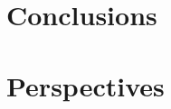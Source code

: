 
\section*{Conclusions} %
\label{sec:conclusion__conclusions}

\lipsum[1-2]




\section*{Perspectives} %
\label{sec:conclusion__perspectives}

\lipsum[1-2]




